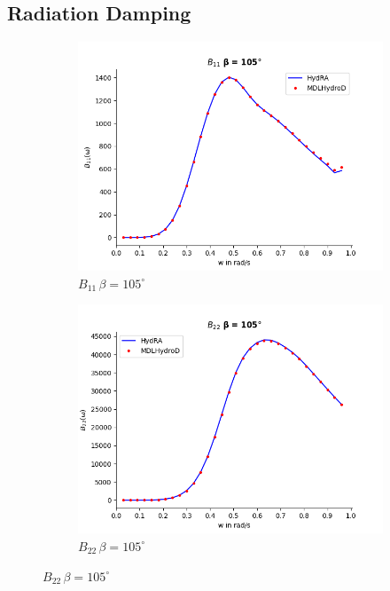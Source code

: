 \subsection{Radiation Damping}
\begin{figure}[H]
    \centering
    \begin{subfigure}[b]{0.45\textwidth}
        \includegraphics[width=\textwidth]{plots/kcs/rad_damp_deg_120/b11.png}
        \caption{$B_{11} \, \beta = 105^{\circ}$}
    \end{subfigure}
    \begin{subfigure}[b]{0.45\textwidth}
        \includegraphics[width=\textwidth]{plots/kcs/rad_damp_deg_120/b22.png}
        \caption{$B_{22} \, \beta = 105^{\circ}$}

\end{subfigure}
\end{figure}
